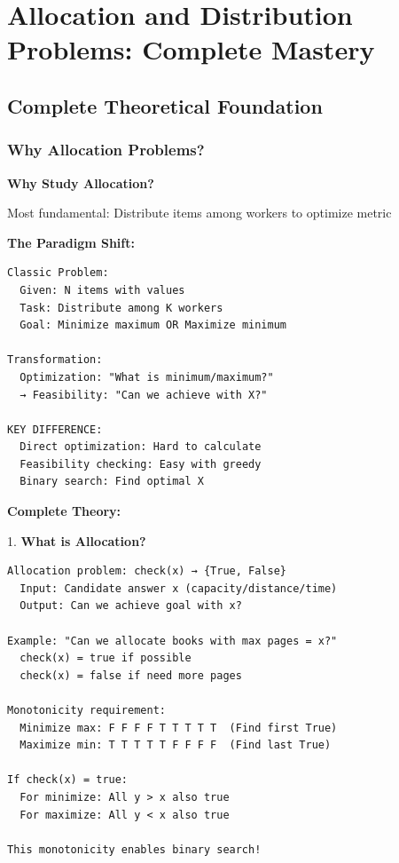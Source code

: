 \documentclass[11pt,a4paper,oneside]{book}
\begin{document}
\section{Allocation and Distribution Problems: Complete Mastery}

\subsection{Complete Theoretical Foundation}

\subsubsection{Why Allocation Problems?}

\begin{tcolorbox}[
    enhanced,breakable,
    colback=white,
    colframe=deepblue,
    boxrule=1.5pt,
    arc=3mm,
    title=\textbf{The Allocation Paradigm}
]
\textbf{Why Study Allocation?}

Most fundamental: Distribute items among workers to optimize metric

\textbf{The Paradigm Shift:}
\begin{verbatim}
Classic Problem:
  Given: N items with values
  Task: Distribute among K workers
  Goal: Minimize maximum OR Maximize minimum
  
Transformation:
  Optimization: "What is minimum/maximum?"
  → Feasibility: "Can we achieve with X?"
  
KEY DIFFERENCE:
  Direct optimization: Hard to calculate
  Feasibility checking: Easy with greedy
  Binary search: Find optimal X
\end{verbatim}

\textbf{Complete Theory:}

1. \textbf{What is Allocation?}
\begin{verbatim}
Allocation problem: check(x) → {True, False}
  Input: Candidate answer x (capacity/distance/time)
  Output: Can we achieve goal with x?

Example: "Can we allocate books with max pages = x?"
  check(x) = true if possible
  check(x) = false if need more pages

Monotonicity requirement:
  Minimize max: F F F F T T T T T  (Find first True)
  Maximize min: T T T T T F F F F  (Find last True)

If check(x) = true:
  For minimize: All y > x also true
  For maximize: All y < x also true

This monotonicity enables binary search!
\end{verbatim}


\end{tcolorbox}
\end{document}
